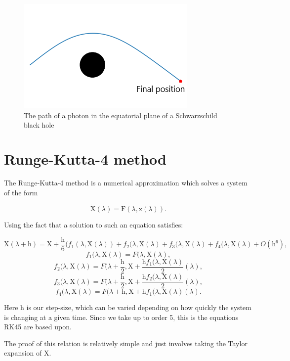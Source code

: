 \documentclass[oneside,openright,frontopenright, singlespacing]{dmathesis}
\begin{document}
\begin{figure}[!ht]
	\centering
	\includegraphics[width=0.4\linewidth]{img/Schwarzschildpath}
	\caption{The path of a photon in the equatorial plane of a Schwarzschild black hole}
	\label{fig:Figure3.1}
\end{figure}

\section{Runge-Kutta-4 method}\label{subsec:Subsection3.4.1}

	The Runge-Kutta-4 method is a numerical approximation which solves a system of the form

\vspace{1em}
\[\dot{\mbox{X}}(\lambda) = \mbox{F}(\lambda,\mbox{x}(\lambda)).\]

\vspace{1em}
	Using the fact that a solution to such an equation satisfies:

\vspace{1em}
	\[\mbox{X}(\lambda+\mbox{h}) = \mbox{X} + \frac{\mbox{h}}{6}(f_1(\lambda,\mbox{X}(\lambda))+f_2(\lambda,\mbox{X}(\lambda)+f_3(\lambda,\mbox{X}(\lambda)+f_4(\lambda,\mbox{X}(\lambda) + O(\mbox{h}^6),\]
	\[f_1(\lambda,\mbox{X}(\lambda) = F(\lambda,\mbox{X}(\lambda),\]
	\[f_2(\lambda,\mbox{X}(\lambda) = F(\lambda+\frac{\mbox{h}}{2},\mbox{X}+\frac{\mbox{h}f_1(\lambda,\mbox{X}(\lambda)}{2}(\lambda),\]
	\[f_3(\lambda,\mbox{X}(\lambda) = F(\lambda+\frac{\mbox{h}}{2},\mbox{X}+\frac{\mbox{h}f_2(\lambda,\mbox{X}(\lambda)}{2}(\lambda),\]
	\[f_4(\lambda,\mbox{X}(\lambda) = F(\lambda+\mbox{h},\mbox{X}+\mbox{h}f_1(\lambda,\mbox{X}(\lambda)(\lambda).\]

\vspace{1em}
	Here h is our step-size, which can be varied depending on how quickly the system is changing at a given time. Since we take up to order 5, this is the equations RK45 are based upon.

\vspace{1em}
	The proof of this relation is relatively simple and just involves taking the Taylor expansion of X.
\end{document}

